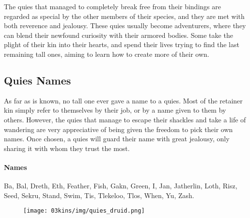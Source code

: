 \begin{linenumbers}
The quies that managed to completely break free from their bindings are regarded as special by the other members of their species, and they are met with both reverence and jealousy.
These quies usually become adventurers, where they can blend their newfound curiosity with their armored bodies.
Some take the plight of their kin into their hearts, and spend their lives trying to find the last remaining tall ones, aiming to learn how to create more of their own.

\subsection*{Quies Names}
As far as is known, no tall one ever gave a name to a quies.
Most of the retainer kin simply refer to themselves by their job, or by a name given to them by others.
However, the quies that manage to escape their shackles and take a life of wandering are very appreciative of being given the freedom to pick their own names.
Once chosen, a quies will guard their name with great jealousy, only sharing it with whom they trust the most.

\paragraph{Names} Ba, Bal, Dreth, Eth, Feather, Fish, Gakn, Green, I, Jan, Jatherlin, Loth, Risz, Seed, Sekru, Stand, Swim, Tis, Tlekeloo, Tlos, When, Yu, Zash.

\begin{figure}[!t]
    \centering
    \texttt{[image: 03kins/img/quies\_druid.png]}
\end{figure}


\end{linenumbers}
